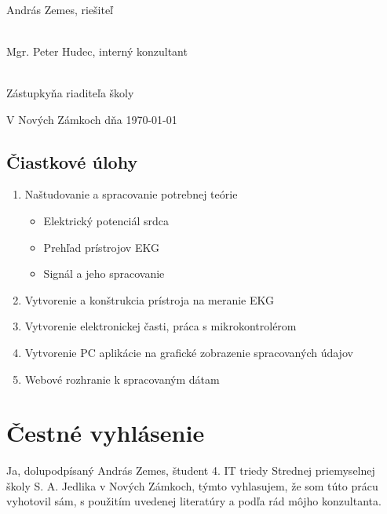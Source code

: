 \documentclass[titlepage,12pt]{article}
\begin{document}
\vspace{20mm}
\hrulefill
\\\hspace*{0mm}\phantom{v.r.: }András Zemes, riešiteľ

\vspace{10mm}
\hrulefill
\\\hspace*{0mm}\phantom{v.r.: }Mgr. Peter Hudec, interný konzultant

\vspace{10mm}
\hrulefill
\\\hspace*{0mm}\phantom{v.r.: }Zástupkyňa riaditeľa školy

\vspace{10mm}
V Nových Zámkoch dňa \today

\newpage

\subsection*{Čiastkové úlohy}
\begin{enumerate}
	\item Naštudovanie a spracovanie potrebnej teórie
	\begin{itemize}
		\item Elektrický potenciál srdca
       	\item Prehľad prístrojov EKG
       	\item Signál a jeho spracovanie
	\end{itemize}
    \item Vytvorenie a konštrukcia prístroja na meranie EKG
    \item Vytvorenie elektronickej časti, práca s mikrokontrolérom
    \item Vytvorenie PC aplikácie na grafické zobrazenie spracovaných údajov
    \item Webové rozhranie k spracovaným dátam
\end{enumerate}

\newpage
\vspace*{\fill}
\section*{Čestné vyhlásenie}

Ja, dolupodpísaný András Zemes, študent 4. IT triedy Strednej priemyselnej školy S. A. Jedlika v Nových Zámkoch, týmto vyhlasujem, že som túto prácu   vyhotovil sám, s použitím uvedenej literatúry a podľa rád môjho konzultanta. 
\end{document}
